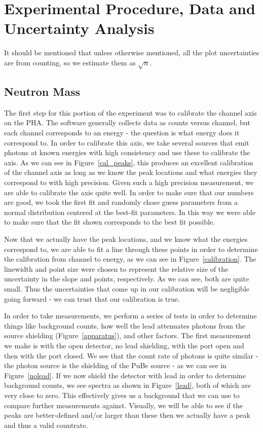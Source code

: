 \documentclass{article}
\begin{document}
\section{Experimental Procedure, Data and Uncertainty Analysis}
  It should be mentioned that unless otherwise mentioned, all the plot uncertainties are from counting, so we estimate them as $\sqrt{n}$.
  \subsection{Neutron Mass}
  The first step for this portion of the experiment was to calibrate the channel axis on the PHA.  The software generally collects data as counts versus channel, but each channel corresponds to an energy - the question is what energy does it correspond to.  In order to calibrate this axis, we take several sources that emit photons at known energies with high consistency and use these to calibrate the axis.  As we can see in Figure~\ref{cal_peaks}, this produces an excellent calibration of the channel axis as long as we know the peak locations and what energies they correspond to with high precision.  Given such a high precision measurement, we are able to calibrate the axis quite well.  In order to make sure that our numbers are good, we took the first fit and randomly chose guess parameters from a normal distribution centered at the best-fit parameters.  In this way we were able to make sure that the fit shown corresponds to the best fit possible.

  \hspace{.25cm}

  Now that we actually have the peak locations, and we know what the energies correspond to, we are able to fit a line through these points in order to determine the calibration from channel to energy, as we can see in Figure~\ref{calibration}.  The linewidth and point size were chosen to represent the relative size of the uncertainty in the slope and points, respectively.  As we can see, both are quite small.  Thus the uncertainties that come up in our calibration will be negligible going forward - we can trust that our calibration is true.

  \hspace{.25cm}

  In order to take measurements, we perform a series of tests in order to determine things like background counts, how well the lead attenuates photons from the source shielding (Figure~\ref{apparatus}), and other factors.  The first measurement we make is with the open detector, no lead shielding, with the port open and then with the port closed.  We see that the count rate of photons is quite similar - the photon source is the shielding of the PuBe source - as we can see in Figure~\ref{nolead}.  If we now shield the detector with lead in order to determine background counts, we see spectra as shown in Figure~\ref{lead}, both of which are very close to zero.  This effectively gives us a background that we can use to compare further measurements against.  Visually, we will be able to see if the peaks are better-defined and/or larger than these then we actually have a peak and thus a valid countrate.
\end{document}
